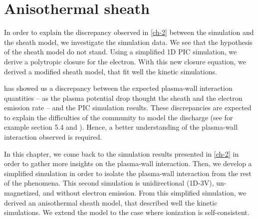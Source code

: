 



\chapter{Anisothermal sheath}
\label{ch-3}

In order to explain the discrepancy observed in \cref{ch-2} between the simulation and the sheath model, we investigate the simulation data.
We see that the hypothesis of the sheath model do not stand.
Using a simplified \ac{1D} \ac{PIC} simulation, we derive a polytropic closure for the electron.
With this new closure equation, we derived a modified sheath model, that fit well the kinetic simulations. 

% 
% 
% 
% 
% 


\minitoc

 has showed us a discrepancy between the expected plasma-wall interaction quantities -- as the plasma potential drop thought the sheath and the electron emission rate -- and the \ac{PIC} simulation results.
These discrepancies are expected to explain the difficulties of the community to model the discharge (see for example \citet{croes2017} section 5.4 and \citet{raitses2011}).
Hence, a better understanding of the plasma-wall interaction observed is required.

In this chapter, we come back to the simulation results presented in \cref{ch-2}  in order to gather more insights on the plasma-wall interaction.
Then, we develop a simplified simulation in order to isolate the plasma-wall interaction from the rest of the phenomena.
This second simulation is unidirectional (\acs{1D}-\acs{3V}), un-magnetized, and without electron emission.
From this simplified simulation, we derived an anisothermal sheath model, that described well the kinetic simulations.
We extend the model to the case where ionization is self-consistent.









